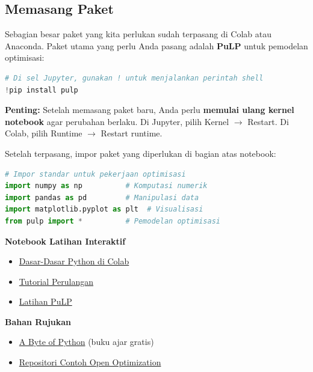 \subsection{Memasang Paket}

Sebagian besar paket yang kita perlukan sudah terpasang di Colab atau Anaconda. Paket utama yang perlu Anda pasang adalah \textbf{PuLP} untuk pemodelan optimisasi:

\begin{lstlisting}[language=Python]
# Di sel Jupyter, gunakan ! untuk menjalankan perintah shell
!pip install pulp
\end{lstlisting}

\textbf{Penting:} Setelah memasang paket baru, Anda perlu \textbf{memulai ulang kernel notebook} agar perubahan berlaku. Di Jupyter, pilih Kernel $\rightarrow$ Restart. Di Colab, pilih Runtime $\rightarrow$ Restart runtime.

Setelah terpasang, impor paket yang diperlukan di bagian atas notebook:

\begin{lstlisting}[language=Python]
# Impor standar untuk pekerjaan optimisasi
import numpy as np          # Komputasi numerik
import pandas as pd         # Manipulasi data
import matplotlib.pyplot as plt  # Visualisasi
from pulp import *          # Pemodelan optimisasi
\end{lstlisting}

\begin{resource}
\textbf{Notebook Latihan Interaktif}
\begin{itemize}
\item \href{https://colab.research.google.com/drive/1dqQSVfNMchIbk0k4OByve0muZeyvih6j?usp=sharing}{Dasar-Dasar Python di Colab}
\item \href{https://colab.research.google.com/drive/1Ma8tQw6LU0NCF3jY62v7FAmXJOxbSph_?usp=sharing}{Tutorial Perulangan}
\item \href{https://colab.research.google.com/drive/1paYp36cHf_EvZcMYfD-dN1TtJ_abkpM2?usp=sharing}{Latihan PuLP}
\end{itemize}

\textbf{Bahan Rujukan}
\begin{itemize}
\item \href{https://open.umn.edu/opentextbooks/textbooks/a-byte-of-python}{A Byte of Python} (buku ajar gratis)
\item \href{https://github.com/open-optimization/open-optimization-or-examples}{Repositori Contoh Open Optimization}
\end{itemize}
\end{resource}


